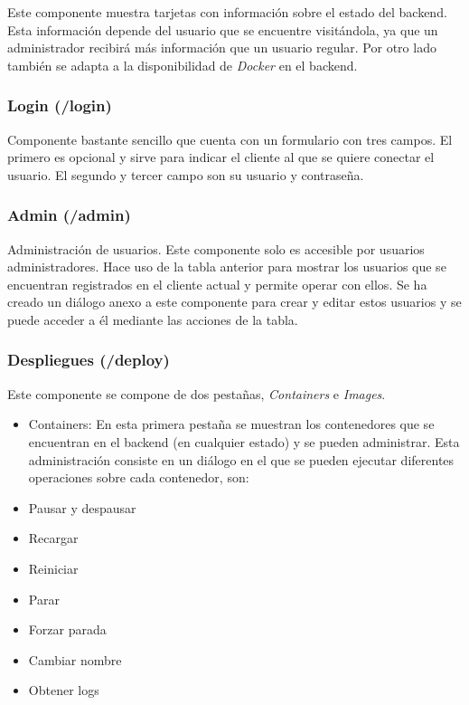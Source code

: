Este componente muestra tarjetas con información sobre el estado del backend. Esta información depende del usuario que se encuentre visitándola, ya que un administrador recibirá más información que un usuario regular. Por otro lado también se adapta a la disponibilidad de \textit{Docker} en el backend.


\subsubsection{Login (/login)}


Componente bastante sencillo que cuenta con un formulario con tres campos. El primero es opcional y sirve para indicar el cliente al que se quiere conectar el usuario. El segundo y tercer campo son su usuario y contraseña.


\subsubsection{Admin (/admin)}
\label{sec:admin}

Administración de usuarios. Este componente solo es accesible por usuarios administradores. Hace uso de la tabla anterior para mostrar los usuarios que se encuentran registrados en el cliente actual y permite operar con ellos. Se ha creado un diálogo anexo a este componente para crear y editar estos usuarios y se puede acceder a él mediante las acciones de la tabla.



\subsubsection{Despliegues (/deploy)}

Este componente se compone de dos pestañas, \textit{Containers} e \textit{Images}.
\begin{itemize}
	\item Containers: En esta primera pestaña se muestran los contenedores que se encuentran en el backend (en cualquier estado) y se pueden administrar. Esta administración consiste en un diálogo en el que se pueden ejecutar diferentes operaciones sobre cada contenedor, son:
	\item Pausar y despausar
	\item Recargar
	\item Reiniciar
	\item Parar
	\item Forzar parada
	\item Cambiar nombre
	\item Obtener logs
\end{itemize}

